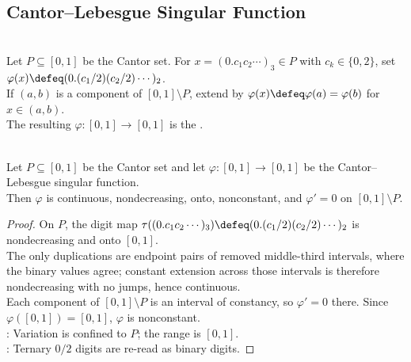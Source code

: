 \subsection{Cantor--Lebesgue Singular Function}

\begin{definition} \label{def:cantor-lebesgue-singular-function-source} \\
Let $P\subseteq[0,1]$ be the Cantor set. For $x=(0.c_1c_2\cdots)_3\in P$ with $c_k\in\{0,2\}$, set $\varphi(x)\defeq(0.(c_1/2)(c_2/2)\cdots)_2$.\\
If $(a,b)$ is a component of $[0,1]\setminus P$, extend by $\varphi(x)\defeq\varphi(a)=\varphi(b)$ for $x\in(a,b)$.\\
The resulting $\varphi:[0,1]\to[0,1]$ is the .
\end{definition}

\begin{proposition} \label{prop:cantor-singular-function-properties} \\
Let $P\subseteq[0,1]$ be the Cantor set and let $\varphi:[0,1]\to[0,1]$ be the Cantor--Lebesgue singular function.\\
Then $\varphi$ is continuous, nondecreasing, onto, nonconstant, and $\varphi'=0$ on $[0,1]\setminus P$.
\begin{proof} On $P$, the digit map $\tau((0.c_1c_2\cdots)_3)\defeq(0.(c_1/2)(c_2/2)\cdots)_2$ is nondecreasing and onto $[0,1]$.\\
The only duplications are endpoint pairs of removed middle-third intervals, where the binary values agree; constant extension across those intervals is therefore nondecreasing with no jumps, hence continuous.\\
Each component of $[0,1]\setminus P$ is an interval of constancy, so $\varphi'=0$ there. Since $\varphi([0,1])=[0,1]$, $\varphi$ is nonconstant.\\
: Variation is confined to $P$; the range is $[0,1]$.\\
: Ternary $0/2$ digits are re-read as binary digits.
\end{proof}
\end{proposition}

